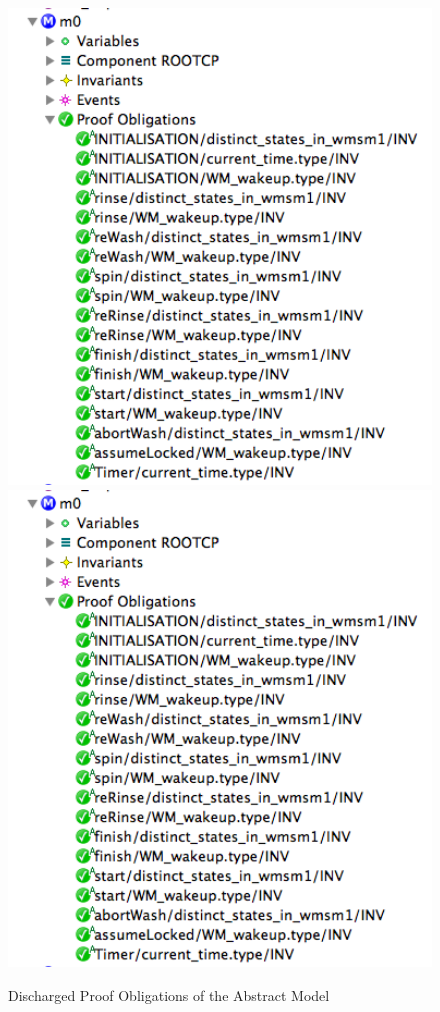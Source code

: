  \begin{figure}[!htbp]
  \centering
  \ifplastex
  \includegraphics[width=1024]{figures/image14.png}
  \else
  \includegraphics[width=1\textwidth]{figures/image14.png}
  \fi
  \caption{Discharged Proof Obligations of the Abstract Model}
  \label{fig:DischargedProofObligationsOfTheAbstractModel}
\end{figure} 

